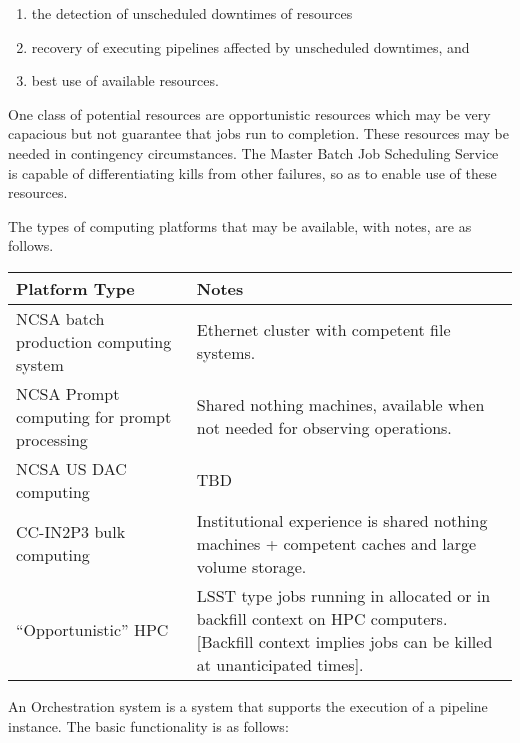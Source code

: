 \begin{enumerate}

\item the detection of unscheduled downtimes of resources

\item recovery of executing pipelines affected by unscheduled downtimes, and

\item best use of available resources.

\end{enumerate}

One class of potential resources  are opportunistic resources which may be very
capacious but not guarantee that jobs run to completion. These resources may be
needed in contingency circumstances. The Master Batch Job Scheduling Service is
capable of differentiating kills from other failures, so as to enable use of
these resources.

The types of computing platforms that may be available, with notes, are as
follows.

\begin{longtable}{|p{}|p{}|}\hline
\textbf{Platform Type} & \textbf{Notes} \\\hline
NCSA batch production computing system & Ethernet cluster with competent 
file systems. \\\hline
NCSA Prompt computing for prompt processing & Shared nothing machines, available
when not needed for observing operations. \\\hline
NCSA US DAC computing & TBD \\\hline
CC-IN2P3 bulk computing & Institutional experience is shared nothing machines +
competent caches
and large volume storage. \\\hline
``Opportunistic'' HPC & LSST type jobs  running in allocated or in  backfill
context on HPC computers. [Backfill context implies jobs can be killed at
unanticipated times]. \\\hline
\end{longtable}

An Orchestration system is a system that supports the execution of a pipeline
instance. The basic functionality is as follows:

